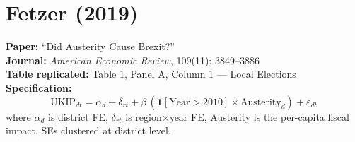 \documentclass[11pt,a4paper]{article}
\begin{document}
\section{Fetzer (2019)}

\textbf{Paper:} ``Did Austerity Cause Brexit?''\\
\textbf{Journal:} \textit{American Economic Review}, 109(11): 3849--3886\\
\textbf{Table replicated:} Table 1, Panel A, Column 1 --- Local Elections\\
\textbf{Specification:}
\[
\text{UKIP}_{dt} = \alpha_d + \delta_{rt} + \beta\,(\mathbf{1}[\text{Year}>2010] \times \text{Austerity}_d) + \varepsilon_{dt}
\]
where $\alpha_d$ is district FE, $\delta_{rt}$ is region$\times$year FE, Austerity is the per-capita fiscal impact. SEs clustered at district level.

\vspace{0.3cm}
\noindent{}
\end{document}
